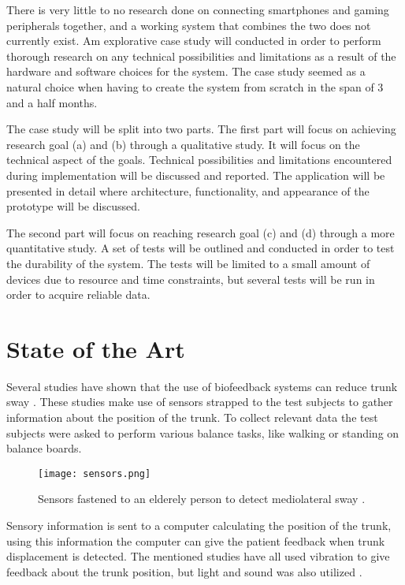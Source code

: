There is very little to no research done on connecting smartphones and gaming peripherals together, and a working system that combines the two does not currently exist. Am explorative case study will conducted in order to perform thorough research on any technical possibilities and limitations as a result of the hardware and software choices for the system. The case study seemed as a natural choice when having to create the system from scratch in the span of 3 and a half months.

The case study will be split into two parts. The first part will focus on achieving research goal (a) and (b) through a qualitative study. It will focus on the technical aspect of the goals. Technical possibilities and limitations encountered during implementation will be discussed and reported. The application will be presented in detail where architecture, functionality, and appearance of the prototype will be discussed.

The second part will focus on reaching research goal (c) and (d) through a more quantitative study. A set of tests will be outlined and conducted in order to test the durability of the system. The tests will be limited to a small amount of devices due to resource and time constraints, but several tests will be run in order to acquire reliable data.

\section{State of the Art}

Several studies have shown that the use of biofeedback systems can reduce trunk sway \cite{multiModualBiofeedback, vibrotactileBiofeedback, vibrotactileTiltFeedback}. These studies make use of sensors strapped to the test subjects to gather information about the position of the trunk. To collect relevant data the test subjects were asked to perform various balance tasks, like walking or standing on balance boards.

\begin{figure}[h!]
  \centering
    \texttt{[image: sensors.png]}
    \caption{\footnotesize Sensors fastened to an elderely person to detect mediolateral sway \cite{vibrotactileTiltFeedback}.}
\end{figure}

Sensory information is sent to a computer calculating the position of the trunk, using this information the computer can give the patient feedback when trunk displacement is detected. The mentioned studies have all used vibration to give feedback about the trunk position, but light and sound was also utilized \cite{multiModualBiofeedback}. 

